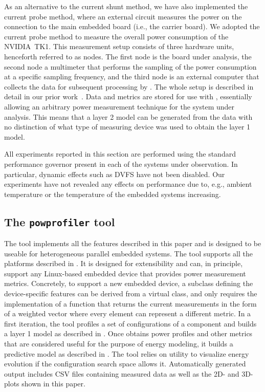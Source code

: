 As an alternative to the current shunt method, we have also implemented the current probe method, where an external circuit measures the power on the connection to the main embedded board (i.e., the carrier board). We adopted the current probe method to measure the overall power consumption of the NVIDIA~TK1. This measurement setup consists of three hardware units, henceforth referred to as nodes. The first node is the board under analysis, the second node a multimeter that performs the sampling of the power consumption at a specific sampling frequency, and the third node is an external computer that collects the data for subsequent processing by \powprof{}. The whole setup is described in detail in our prior work~\citep{seewald2019hlpgpu}. Data and metrics are stored for use with \powprof{}, essentially allowing an arbitrary power measurement technique for the system under analysis. This means that a layer 2 model can be generated from the data with no distinction of what type of measuring device was used to obtain the layer 1 model.

All experiments reported in this section are performed using the standard performance governor present in each of the systems under observation. In particular, dynamic effects such as DVFS have not been disabled. Our experiments have not revealed any effects on performance due to, e.g., ambient temperature or the temperature of the embedded systems increasing.

\subsection{\color{cyan}The {\tt powprofiler} tool}
\label{sec:powprof}

The \powprof{} tool implements all the features described in this paper and is designed to be useable for heterogeneous parallel embedded systems. The tool supports all the platforms described in . It is designed for extensibility and can, in principle, support any Linux-based embedded device that provides power measurement metrics. Concretely, to support a new embedded device, a subclass defining the device-specific features can be derived from a virtual class, and only requires the implementation of a function that returns the current measurements in the form of a weighted vector where every element can represent a different metric. In a first iteration, the tool profiles a set of configurations of a component and builds a layer 1 model as described in . Once \powprof{} obtains power profiles and other metrics that are considered useful for the purpose of energy modeling, it builds a predictive model as described in . The tool relies on  utility to visualize energy evolution if the configuration search space allows it. Automatically generated output includes CSV files containing measured data as well as the 2D- and 3D-plots shown in this paper.

